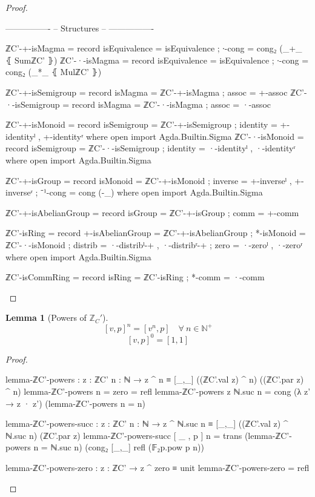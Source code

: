\documentclass[a4paper]{report}
\theoremstyle{definition}
\theoremstyle{lemma}
\newtheorem{lemma}{Lemma}
\theoremstyle{theorem}
\newcommand\bN{\mathbb{N}}
\newcommand\bZ{\mathbb{Z}}
\begin{document}
\begin{proof}
\begin{code}
  ----------------
  -- Structures --
  ----------------

  ℤC'-+-isMagma = record
    { isEquivalence = isEquivalence
    ; ∙-cong        =  cong₂ (_+_ ⦃ SumℤC' ⦄)
    }
  ℤC'-·-isMagma = record
    { isEquivalence = isEquivalence
    ; ∙-cong        =  cong₂ (_*_ ⦃ MulℤC' ⦄)
    }

  ℤC'-+-isSemigroup = record
    { isMagma = ℤC'-+-isMagma
    ; assoc   = +-assoc
    }
  ℤC'-·-isSemigroup = record
    { isMagma = ℤC'-·-isMagma
    ; assoc   = ·-assoc
    }

  ℤC'-+-isMonoid = record
    { isSemigroup = ℤC'-+-isSemigroup
    ; identity    = +-identityˡ , +-identityʳ
    }
    where open import Agda.Builtin.Sigma
  ℤC'-·-isMonoid = record
    { isSemigroup = ℤC'-·-isSemigroup
    ; identity    = ·-identityˡ , ·-identityʳ
    }
    where open import Agda.Builtin.Sigma

  ℤC'-+-isGroup = record
    { isMonoid = ℤC'-+-isMonoid
    ; inverse  = +-inverseˡ , +-inverseʳ
    ; ⁻¹-cong  = cong (-_)
    }
    where open import Agda.Builtin.Sigma

  ℤC'-+-isAbelianGroup = record
    { isGroup = ℤC'-+-isGroup
    ; comm    = +-comm
    }

  ℤC'-isRing = record
    { +-isAbelianGroup = ℤC'-+-isAbelianGroup
    ; *-isMonoid       = ℤC'-·-isMonoid
    ; distrib          = ·-distribˡ-+ , ·-distribʳ-+
    ; zero             = ·-zeroˡ , ·-zeroʳ
    }
    where open import Agda.Builtin.Sigma

  ℤC'-isCommRing = record
    { isRing = ℤC'-isRing
    ; *-comm = ·-comm
    }
  \end{code}
\end{proof}

\begin{lemma}[Powers of $\bZ_C'$]
  \[[v,p]^n = [v^n,p]\quad\forall\ n\in\bN^+\]
  \[[v,p]^0 = [1,1]\]
\end{lemma}
\begin{proof}~\\
  \begin{code}
lemma-ℤC'-powers : {z : ℤC'} {n : ℕ}
  → z ^ n ≡ [_,_] ((ℤC'.val z) ^ n) ((ℤC'.par z) ^ n)
lemma-ℤC'-powers {n = zero}    = refl
lemma-ℤC'-powers {z} {ℕ.suc n} = cong (λ z' → z · z') (lemma-ℤC'-powers {n = n})

lemma-ℤC'-powers-succ : {z : ℤC'} {n : ℕ}
  → z ^ ℕ.suc n ≡ [_,_] ((ℤC'.val z) ^ ℕ.suc n) (ℤC'.par z)
lemma-ℤC'-powers-succ {[ _ , p ]} {n}
  = trans (lemma-ℤC'-powers {n = ℕ.suc n}) (cong₂ [_,_] refl (𝔽₂p.pow p n))

lemma-ℤC'-powers-zero : {z : ℤC'} → z ^ zero ≡ unit
lemma-ℤC'-powers-zero = refl
\end{code}
\end{proof}
\end{document}
